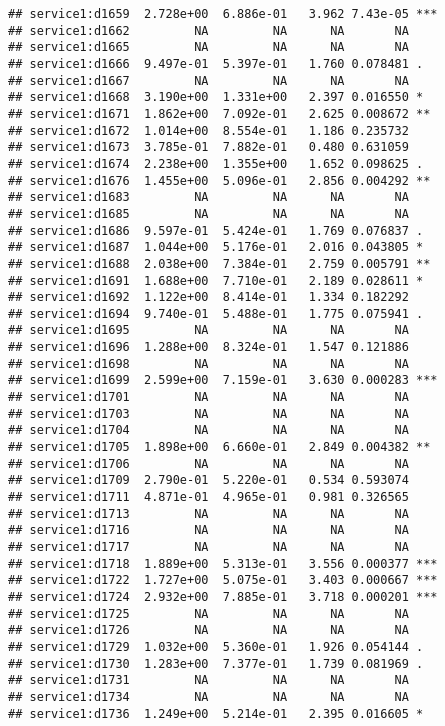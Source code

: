 \documentclass[
]{article}
\begin{document}
\begin{verbatim}
## service1:d1659  2.728e+00  6.886e-01   3.962 7.43e-05 ***
## service1:d1662         NA         NA      NA       NA    
## service1:d1665         NA         NA      NA       NA    
## service1:d1666  9.497e-01  5.397e-01   1.760 0.078481 .  
## service1:d1667         NA         NA      NA       NA    
## service1:d1668  3.190e+00  1.331e+00   2.397 0.016550 *  
## service1:d1671  1.862e+00  7.092e-01   2.625 0.008672 ** 
## service1:d1672  1.014e+00  8.554e-01   1.186 0.235732    
## service1:d1673  3.785e-01  7.882e-01   0.480 0.631059    
## service1:d1674  2.238e+00  1.355e+00   1.652 0.098625 .  
## service1:d1676  1.455e+00  5.096e-01   2.856 0.004292 ** 
## service1:d1683         NA         NA      NA       NA    
## service1:d1685         NA         NA      NA       NA    
## service1:d1686  9.597e-01  5.424e-01   1.769 0.076837 .  
## service1:d1687  1.044e+00  5.176e-01   2.016 0.043805 *  
## service1:d1688  2.038e+00  7.384e-01   2.759 0.005791 ** 
## service1:d1691  1.688e+00  7.710e-01   2.189 0.028611 *  
## service1:d1692  1.122e+00  8.414e-01   1.334 0.182292    
## service1:d1694  9.740e-01  5.488e-01   1.775 0.075941 .  
## service1:d1695         NA         NA      NA       NA    
## service1:d1696  1.288e+00  8.324e-01   1.547 0.121886    
## service1:d1698         NA         NA      NA       NA    
## service1:d1699  2.599e+00  7.159e-01   3.630 0.000283 ***
## service1:d1701         NA         NA      NA       NA    
## service1:d1703         NA         NA      NA       NA    
## service1:d1704         NA         NA      NA       NA    
## service1:d1705  1.898e+00  6.660e-01   2.849 0.004382 ** 
## service1:d1706         NA         NA      NA       NA    
## service1:d1709  2.790e-01  5.220e-01   0.534 0.593074    
## service1:d1711  4.871e-01  4.965e-01   0.981 0.326565    
## service1:d1713         NA         NA      NA       NA    
## service1:d1716         NA         NA      NA       NA    
## service1:d1717         NA         NA      NA       NA    
## service1:d1718  1.889e+00  5.313e-01   3.556 0.000377 ***
## service1:d1722  1.727e+00  5.075e-01   3.403 0.000667 ***
## service1:d1724  2.932e+00  7.885e-01   3.718 0.000201 ***
## service1:d1725         NA         NA      NA       NA    
## service1:d1726         NA         NA      NA       NA    
## service1:d1729  1.032e+00  5.360e-01   1.926 0.054144 .  
## service1:d1730  1.283e+00  7.377e-01   1.739 0.081969 .  
## service1:d1731         NA         NA      NA       NA    
## service1:d1734         NA         NA      NA       NA    
## service1:d1736  1.249e+00  5.214e-01   2.395 0.016605 *  

\end{verbatim}
\end{document}
